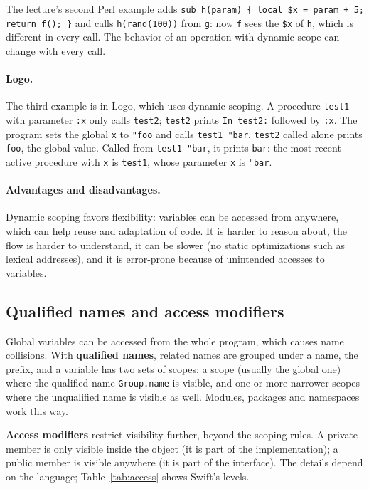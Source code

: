 The lecture's second Perl example adds \texttt{sub h(param) \{ local \$x = param
+ 5; return f(); \}} and calls \texttt{h(rand(100))} from \texttt{g}: now
\texttt{f} sees the \texttt{\$x} of \texttt{h}, which is different in every call.
The behavior of an operation with dynamic scope can change with every call.

\paragraph{Logo.} The third example is in Logo, which uses dynamic scoping. A
procedure \texttt{test1} with parameter \texttt{:x} only calls \texttt{test2};
\texttt{test2} prints \texttt{In test2:} followed by \texttt{:x}. The program
sets the global \texttt{x} to \texttt{"foo} and calls \texttt{test1 "bar}.
\texttt{test2} called alone prints \texttt{foo}, the global value. Called from
\texttt{test1 "bar}, it prints \texttt{bar}: the most recent active procedure
with \texttt{x} is \texttt{test1}, whose parameter \texttt{x} is \texttt{"bar}.

\paragraph{Advantages and disadvantages.} Dynamic scoping favors flexibility:
variables can be accessed from anywhere, which can help reuse and adaptation
of code. It is harder to reason about, the flow is harder to understand, it
can be slower (no static optimizations such as lexical addresses), and it is
error-prone because of unintended accesses to variables.

\subsection{Qualified names and access modifiers}

Global variables can be accessed from the whole program, which causes name
collisions. With \textbf{qualified names}, related names are grouped under a
name, the prefix, and a variable has two sets of scopes: a scope (usually the
global one) where the qualified name \texttt{Group.name} is visible, and one or
more narrower scopes where the unqualified name is visible as well. Modules,
packages and namespaces work this way.

\textbf{Access modifiers} restrict visibility further, beyond the scoping rules.
A private member is only visible inside the object (it is part of the
implementation); a public member is visible anywhere (it is part of the
interface). The details depend on the language; Table~\ref{tab:access} shows
Swift's levels.

